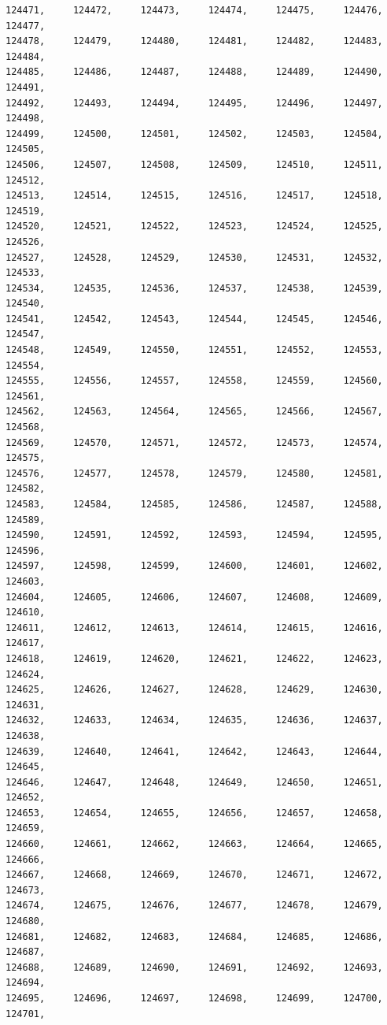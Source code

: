 \documentclass[a4paper,11pt]{report}
\begin{document}
\begin{verbatim}
124471,     124472,     124473,     124474,     124475,     124476,     124477,
124478,     124479,     124480,     124481,     124482,     124483,     124484,
124485,     124486,     124487,     124488,     124489,     124490,     124491,
124492,     124493,     124494,     124495,     124496,     124497,     124498,
124499,     124500,     124501,     124502,     124503,     124504,     124505,
124506,     124507,     124508,     124509,     124510,     124511,     124512,
124513,     124514,     124515,     124516,     124517,     124518,     124519,
124520,     124521,     124522,     124523,     124524,     124525,     124526,
124527,     124528,     124529,     124530,     124531,     124532,     124533,
124534,     124535,     124536,     124537,     124538,     124539,     124540,
124541,     124542,     124543,     124544,     124545,     124546,     124547,
124548,     124549,     124550,     124551,     124552,     124553,     124554,
124555,     124556,     124557,     124558,     124559,     124560,     124561,
124562,     124563,     124564,     124565,     124566,     124567,     124568,
124569,     124570,     124571,     124572,     124573,     124574,     124575,
124576,     124577,     124578,     124579,     124580,     124581,     124582,
124583,     124584,     124585,     124586,     124587,     124588,     124589,
124590,     124591,     124592,     124593,     124594,     124595,     124596,
124597,     124598,     124599,     124600,     124601,     124602,     124603,
124604,     124605,     124606,     124607,     124608,     124609,     124610,
124611,     124612,     124613,     124614,     124615,     124616,     124617,
124618,     124619,     124620,     124621,     124622,     124623,     124624,
124625,     124626,     124627,     124628,     124629,     124630,     124631,
124632,     124633,     124634,     124635,     124636,     124637,     124638,
124639,     124640,     124641,     124642,     124643,     124644,     124645,
124646,     124647,     124648,     124649,     124650,     124651,     124652,
124653,     124654,     124655,     124656,     124657,     124658,     124659,
124660,     124661,     124662,     124663,     124664,     124665,     124666,
124667,     124668,     124669,     124670,     124671,     124672,     124673,
124674,     124675,     124676,     124677,     124678,     124679,     124680,
124681,     124682,     124683,     124684,     124685,     124686,     124687,
124688,     124689,     124690,     124691,     124692,     124693,     124694,
124695,     124696,     124697,     124698,     124699,     124700,     124701,

\end{verbatim}
\end{document}
